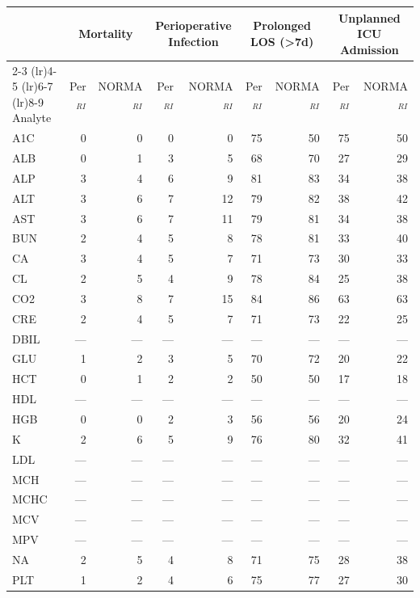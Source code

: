 \begin{table}[ht]
\centering
\footnotesize
\begin{tabular}{lrrrrrrrr}
\toprule
 & \multicolumn{2}{c}{Mortality} & \multicolumn{2}{c}{Perioperative Infection} & \multicolumn{2}{c}{Prolonged LOS (>7d)} & \multicolumn{2}{c}{Unplanned ICU Admission} \\
\cmidrule(lr){2-3} \cmidrule(lr){4-5} \cmidrule(lr){6-7} \cmidrule(lr){8-9}
Analyte & Per$_{RI}$ & NORMA$_{RI}$ & Per$_{RI}$ & NORMA$_{RI}$ & Per$_{RI}$ & NORMA$_{RI}$ & Per$_{RI}$ & NORMA$_{RI}$ \\
\midrule
A1C & 0 & 0 & 0 & 0 & 75 & 50 & 75 & 50 \\
ALB & 0 & 1 & 3 & 5 & 68 & 70 & 27 & 29 \\
ALP & 3 & 4 & 6 & 9 & 81 & 83 & 34 & 38 \\
ALT & 3 & 6 & 7 & 12 & 79 & 82 & 38 & 42 \\
AST & 3 & 6 & 7 & 11 & 79 & 81 & 34 & 38 \\
BUN & 2 & 4 & 5 & 8 & 78 & 81 & 33 & 40 \\
CA & 3 & 4 & 5 & 7 & 71 & 73 & 30 & 33 \\
CL & 2 & 5 & 4 & 9 & 78 & 84 & 25 & 38 \\
CO2 & 3 & 8 & 7 & 15 & 84 & 86 & 63 & 63 \\
CRE & 2 & 4 & 5 & 7 & 71 & 73 & 22 & 25 \\
DBIL & --- & --- & --- & --- & --- & --- & --- & --- \\
GLU & 1 & 2 & 3 & 5 & 70 & 72 & 20 & 22 \\
HCT & 0 & 1 & 2 & 2 & 50 & 50 & 17 & 18 \\
HDL & --- & --- & --- & --- & --- & --- & --- & --- \\
HGB & 0 & 0 & 2 & 3 & 56 & 56 & 20 & 24 \\
K & 2 & 6 & 5 & 9 & 76 & 80 & 32 & 41 \\
LDL & --- & --- & --- & --- & --- & --- & --- & --- \\
MCH & --- & --- & --- & --- & --- & --- & --- & --- \\
MCHC & --- & --- & --- & --- & --- & --- & --- & --- \\
MCV & --- & --- & --- & --- & --- & --- & --- & --- \\
MPV & --- & --- & --- & --- & --- & --- & --- & --- \\
NA & 2 & 5 & 4 & 8 & 71 & 75 & 28 & 38 \\
PLT & 1 & 2 & 4 & 6 & 75 & 77 & 27 & 30 \\

\end{tabular}
\end{table}
